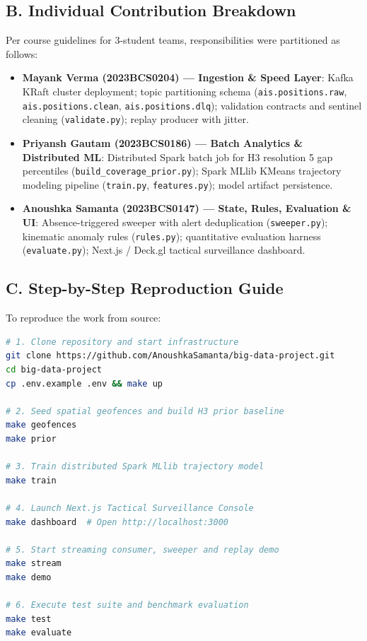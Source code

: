 \documentclass[10pt,twocolumn,a4paper]{article}
\begin{document}
\subsection*{B. Individual Contribution Breakdown}
Per course guidelines for 3-student teams, responsibilities were partitioned as follows:
\begin{itemize}[leftmargin=*]
    \item \textbf{Mayank Verma (2023BCS0204) --- Ingestion \& Speed Layer}: Kafka KRaft cluster deployment; topic partitioning schema (\texttt{ais.positions.raw}, \texttt{ais.positions.clean}, \texttt{ais.positions.dlq}); validation contracts and sentinel cleaning (\texttt{validate.py}); replay producer with jitter.
    \item \textbf{Priyansh Gautam (2023BCS0186) --- Batch Analytics \& Distributed ML}: Distributed Spark batch job for H3 resolution 5 gap percentiles (\texttt{build\_coverage\_prior.py}); Spark MLlib KMeans trajectory modeling pipeline (\texttt{train.py}, \texttt{features.py}); model artifact persistence.
    \item \textbf{Anoushka Samanta (2023BCS0147) --- State, Rules, Evaluation \& UI}: Absence-triggered sweeper with alert deduplication (\texttt{sweeper.py}); kinematic anomaly rules (\texttt{rules.py}); quantitative evaluation harness (\texttt{evaluate.py}); Next.js / Deck.gl tactical surveillance dashboard.
\end{itemize}

\subsection*{C. Step-by-Step Reproduction Guide}
To reproduce the work from source:
\begin{lstlisting}[language=bash]
# 1. Clone repository and start infrastructure
git clone https://github.com/AnoushkaSamanta/big-data-project.git
cd big-data-project
cp .env.example .env && make up

# 2. Seed spatial geofences and build H3 prior baseline
make geofences
make prior

# 3. Train distributed Spark MLlib trajectory model
make train

# 4. Launch Next.js Tactical Surveillance Console
make dashboard  # Open http://localhost:3000

# 5. Start streaming consumer, sweeper and replay demo
make stream
make demo

# 6. Execute test suite and benchmark evaluation
make test
make evaluate
\end{lstlisting}



\end{document}
